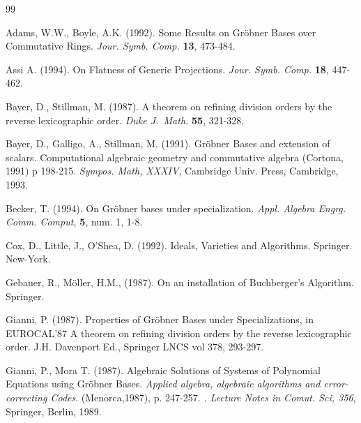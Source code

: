 \begin{thebibliography}{99}

     Adams, W.W., Boyle, A.K. (1992). Some Results on
     Gr\"obner Bases over Commutative Rings.
     {\em Jour. Symb. Comp.} {\bf 13}, 473-484.

     Assi A. (1994). On Flatness of Generic Projections.
     {\em Jour. Symb. Comp.} {\bf 18}, 447-462.

     Bayer, D., Stillman, M. (1987). A theorem on refining
     division orders by the reverse lexicographic order.
     {\em Duke J.\ Math.\/} {\bf 55}, 321-328.

     Bayer, D., Galligo, A., Stillman, M. (1991). Gr\"obner Bases and
     extension of scalars.
     Computational algebraic geometry and commutative algebra
     (Cortona, 1991) p 198-215.
     {\em Sympos. Math, XXXIV}, Cambridge Univ. Press, Cambridge, 1993.

     Becker, T. (1994). On Gr\"obner bases under specialization.
     {\em Appl. Algebra Engrg. Comm. Comput,} {\bf 5}, num. 1, 1-8.

     Cox, D., Little, J., O'Shea, D. (1992). Ideals,
     Varieties and Algorithms. Springer. New-York.

     Gebauer, R., M\"oller, H.M., (1987).
     On an installation of Buchberger's Algorithm.
     Springer.

     Gianni, P. (1987). Properties of Gr\"obner Bases
     under Specializations, in EUROCAL'87
     A theorem on refining division orders by the reverse
     lexicographic order.
     J.H. Davenport Ed., Springer
     LNCS vol 378, 293-297.

     Gianni, P., Mora T. (1987). Algebraic Solutions of Systems of
     Polynomial Equations using Gr\"obner Bases.
     {\em Applied algebra, algebraic algorithms and error-correcting
     Codes}. (Menorca,1987), p. 247-257.
     {\em. Lecture Notes in Comut. Sci, 356}, Springer, Berlin,
     1989.


\end{thebibliography}
